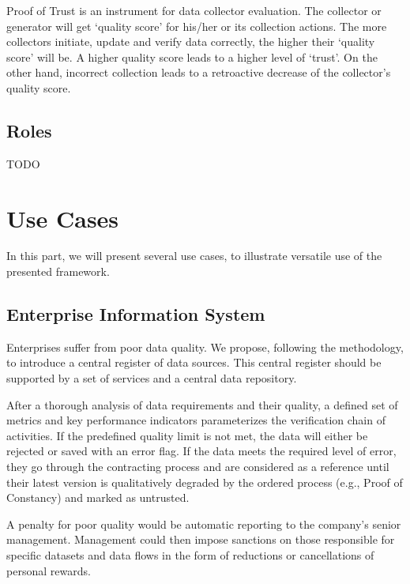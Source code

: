 Proof of Trust is an instrument for data collector evaluation.
The collector or generator will get \enquote*{quality score} for his/her or its collection actions.
The more collectors initiate, update and verify data correctly, the higher their \enquote*{quality score} will be.
A higher quality score leads to a higher level of \enquote*{trust}.
On the other hand, incorrect collection leads to a retroactive decrease of the collector's quality score.

\subsection{Roles}

TODO

\section{Use Cases}

In this part, we will present several use cases, to illustrate versatile use of the presented framework.

\subsection{Enterprise Information System}

Enterprises suffer from poor data quality.
We propose, following the methodology, to introduce a central register of data sources.
This central register should be supported by a set of services and a central data repository.

After a thorough analysis of data requirements and their quality, a defined set of metrics and key performance indicators parameterizes the verification chain of activities.
If the predefined quality limit is not met, the data will either be rejected or saved with an error flag.
If the data meets the required level of error, they go through the contracting process and are considered as a reference until their latest version is qualitatively degraded by the ordered process (e.g., Proof of Constancy) and marked as untrusted.

A penalty for poor quality would be automatic reporting to the company's senior management.
Management could then impose sanctions on those responsible for specific datasets and data flows in the form of reductions or cancellations of personal rewards.

